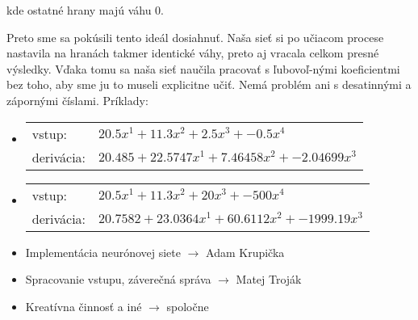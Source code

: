 \documentclass[12pt]{article}
\newcommand{\mysmallsection}[1]{\vspace{0.5cm}{\centering\large\textbf{#1}\\}\normalsize\vspace{0.5cm}}
\def\layersep{2.5cm}
\begin{document}
\begin{center}
\end{center}

\noindent kde ostatné hrany majú váhu 0. 

Preto sme sa pokúsili tento ideál dosiahnuť. Naša sieť si po učiacom procese nastavila na hranách takmer identické váhy, preto aj vracala celkom presné výsledky. Vďaka tomu sa naša sieť naučila pracovať s ľubovoľ-nými koeficientmi bez toho, aby sme ju to museli explicitne učiť. Nemá problém ani s desatinnými a zápornými číslami. Príklady:

\begin{itemize}
\item \begin{tabular}{ l l }
		vstup: & $20.5x^1 + 11.3x^2 + 2.5x^3 + -0.5x^4$\\
		derivácia: & $20.485 + 22.5747x^1 + 7.46458x^2 + -2.04699x^3$
	  \end{tabular}
\item \begin{tabular}{ l l }
		vstup: & $20.5x^1 + 11.3x^2 + 20x^3 + -500x^4$\\
		derivácia: & $20.7582 + 23.0364x^1 + 60.6112x^2 + -1999.19x^3$
	  \end{tabular}
\end{itemize}

\mysmallsection{Rozdelenie práce}

\begin{itemize}
\item Implementácia neurónovej siete $\rightarrow$ Adam Krupička

\item Spracovanie vstupu, záverečná správa $\rightarrow$ Matej Troják

\item Kreatívna činnosť a iné $\rightarrow$ spoločne
\end{itemize}
\end{document}
